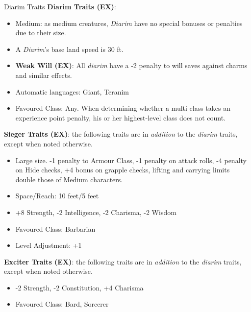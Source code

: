 \begin{35e}{Diarim Traits}
  \textbf{Diarim Traits (EX)}:
  \begin{itemize}[noitemsep]
    \item Medium: as medium creatures, \emph{Diarim} have no special bonuses or
    penalties due to their size.
    \item A \emph{Diarim}'s base land speed is 30 ft.
    \item \textbf{Weak Will (EX)}: All \emph{diarim} have a -2 penalty to will
    saves against charms and similar effects.
    \item Automatic languages: Giant, Teranim
    \item Favoured Class: Any. When determining whether a multi class takes an
    experience point penalty, his or her highest-level class does not count.
  \end{itemize}

  \textbf{Sieger Traits (EX)}: the following traits are in \emph{addition} to
  the \emph{diarim} traits, except when noted otherwise.
  \begin{itemize}[noitemsep]
    \item Large size. -1 penalty to Armour Class, -1 penalty on attack rolls,
    -4 penalty on Hide checks, +4 bonus on grapple checks, lifting and
    carrying limits double those of Medium characters.
    \item Space/Reach: 10 feet/5 feet
    \item +8 Strength, -2 Intelligence, -2 Charisma, -2 Wisdom
    \item Favoured Class: Barbarian
    \item Level Adjustment: +1
  \end{itemize}

  \textbf{Exciter Traits (EX)}: the following traits are in \emph{addition} to
  the \emph{diarim} traits, except when noted otherwise.
  \begin{itemize}[noitemsep]
    \item -2 Strength, -2 Constitution, +4 Charisma
    \item Favoured Class: Bard, Sorcerer
  \end{itemize}
\end{35e}
